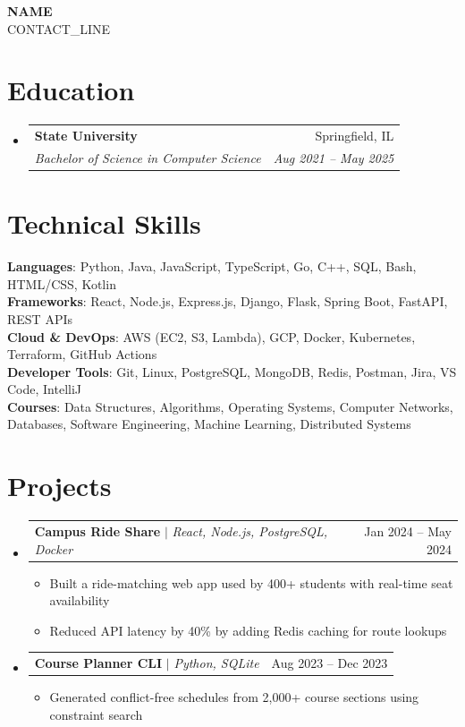 \documentclass[letterpaper,11pt]{article}
\makeatletter
\newcommand{\resumeItem}[1]{
  \item\small{
    {#1 \vspace{-2pt}}
  }
}
\newcommand{\resumeSubheading}[4]{
  \vspace{-2pt}\item
    \begin{tabular*}{0.97\textwidth}[t]{l@{\extracolsep{\fill}}r}
      \textbf{#1} & #2 \\
      \textit{\small#3} & \textit{\small #4} \\
    \end{tabular*}\vspace{-7pt}
}
\newcommand{\resumeProjectHeading}[2]{
    \item
    \begin{tabular*}{0.97\textwidth}{l@{\extracolsep{\fill}}r}
      \small#1 & #2 \\
    \end{tabular*}\vspace{-7pt}
}
\newcommand{\resumeSubHeadingListStart}{\begin{itemize}[leftmargin=0.15in, label={}]}
\newcommand{\resumeSubHeadingListEnd}{\end{itemize}}
\newcommand{\resumeItemListStart}{\begin{itemize}}
\newcommand{\resumeItemListEnd}{\end{itemize}\vspace{-5pt}}
\makeatother
\begin{document}
\begin{center}
    \textbf{\Huge \scshape {{NAME}}} \\ \vspace{1pt}
    \small {{CONTACT_LINE}}
\end{center}

\section{Education}
  \resumeSubHeadingListStart
    \resumeSubheading
      {State University}{Springfield, IL}
      {Bachelor of Science in Computer Science}{Aug 2021 -- May 2025}
  \resumeSubHeadingListEnd

\section{Technical Skills}
 \begin{itemize}[leftmargin=0.15in, label={}]
    \small{\item{
     \textbf{Languages}{: Python, Java, JavaScript, TypeScript, Go, C++, SQL, Bash, HTML/CSS, Kotlin} \\
     \textbf{Frameworks}{: React, Node.js, Express.js, Django, Flask, Spring Boot, FastAPI, REST APIs} \\
     \textbf{Cloud \& DevOps}{: AWS (EC2, S3, Lambda), GCP, Docker, Kubernetes, Terraform, GitHub Actions} \\
     \textbf{Developer Tools}{: Git, Linux, PostgreSQL, MongoDB, Redis, Postman, Jira, VS Code, IntelliJ} \\
     \textbf{Courses}{: Data Structures, Algorithms, Operating Systems, Computer Networks, Databases, Software Engineering, Machine Learning, Distributed Systems}\\
    }}
 \end{itemize}

\section{Projects}
    \resumeSubHeadingListStart
      \resumeProjectHeading
          {\textbf{Campus Ride Share} $|$ \emph{React, Node.js, PostgreSQL, Docker}}{Jan 2024 -- May 2024}
          \resumeItemListStart
            \resumeItem{Built a ride-matching web app used by 400+ students with real-time seat availability}
            \resumeItem{Reduced API latency by 40\% by adding Redis caching for route lookups}
          \resumeItemListEnd
      \resumeProjectHeading
          {\textbf{Course Planner CLI} $|$ \emph{Python, SQLite}}{Aug 2023 -- Dec 2023}
          \resumeItemListStart
            \resumeItem{Generated conflict-free schedules from 2,000+ course sections using constraint search}
          \resumeItemListEnd
    \resumeSubHeadingListEnd
\end{document}
